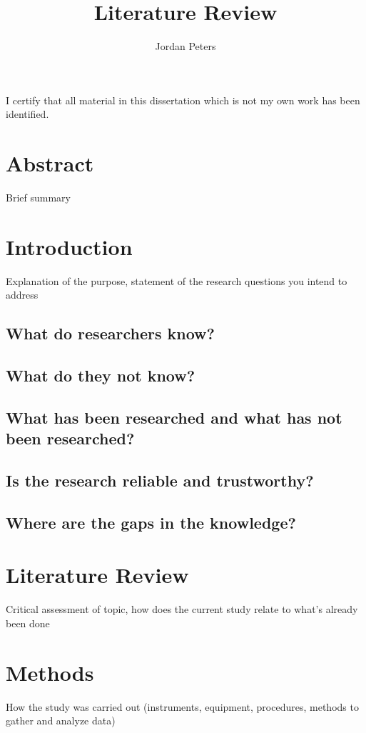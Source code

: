 \documentclass[a4paper, 11pt]{article}
\title{Literature Review}
\author{Jordan Peters}
\begin{document}
\begin{titlepage}
    \maketitle
    I certify that all material in this dissertation which is not my own work has been identified.
\end{titlepage}


\section{Abstract}
Brief summary

\section{Introduction}
Explanation of the purpose, statement of the research questions you intend to address

\subsection{What do researchers know?}


\subsection{What do they not know?}


\subsection{What has been researched and what has not been researched?}


\subsection{Is the research reliable and trustworthy?}


\subsection{Where are the gaps in the knowledge?}

\section{Literature Review}
Critical assessment of topic, how does the current study relate to what's already been done

\section{Methods}
How the study was carried out (instruments, equipment, procedures, methods to gather and analyze data)
\end{document}
